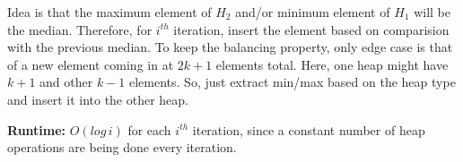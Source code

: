 \documentclass{article}
\begin{document}
	Idea is that the maximum element of $H_2$ and/or minimum element of $H_1$ will be the median. Therefore, for $i^{th}$ iteration, insert the element based on comparision with the previous median. To keep the balancing property, only edge case is that of a new element coming in at $2k+1$ elements total. Here, one heap might have $k+1$ and other $k-1$ elements. So, just extract min/max based on the heap type and insert it into the other heap. \newline
	
	\textbf{Runtime:} $O(log \, i)$ for each $i^{th}$ iteration, since a constant number of heap operations are being done every iteration.
	
\end{document}
